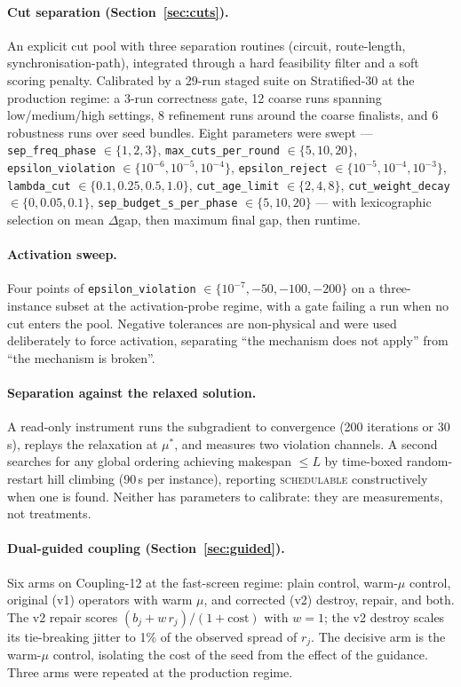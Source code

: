 \documentclass[11pt,a4paper]{article}
\begin{document}
\paragraph{Cut separation (Section~\ref{sec:cuts}).}
An explicit cut pool with three separation routines (circuit, route-length,
synchronisation-path), integrated through a hard feasibility filter and a soft
scoring penalty. Calibrated by a 29-run staged suite on Stratified-30 at the
production regime: a 3-run correctness gate, 12 coarse runs spanning
low/medium/high settings, 8 refinement runs around the coarse finalists, and 6
robustness runs over seed bundles. Eight parameters were swept ---
\texttt{sep\_freq\_phase} $\in\{1,2,3\}$,
\texttt{max\_cuts\_per\_round} $\in\{5,10,20\}$,
\texttt{epsilon\_violation} $\in\{10^{-6},10^{-5},10^{-4}\}$,
\texttt{epsilon\_reject} $\in\{10^{-5},10^{-4},10^{-3}\}$,
\texttt{lambda\_cut} $\in\{0.1,0.25,0.5,1.0\}$,
\texttt{cut\_age\_limit} $\in\{2,4,8\}$,
\texttt{cut\_weight\_decay} $\in\{0,0.05,0.1\}$,
\texttt{sep\_budget\_s\_per\_phase} $\in\{5,10,20\}$ --- with lexicographic
selection on mean $\Delta$gap, then maximum final gap, then runtime.

\paragraph{Activation sweep.}
Four points of \texttt{epsilon\_violation} $\in\{10^{-7},-50,-100,-200\}$ on a
three-instance subset at the activation-probe regime, with a gate failing a run
when no cut enters the pool. Negative tolerances are non-physical and were used
deliberately to force activation, separating ``the mechanism does not apply'' from
``the mechanism is broken''.

\paragraph{Separation against the relaxed solution.}
A read-only instrument runs the subgradient to convergence (200 iterations or
30\,s), replays the relaxation at $\mu^\ast$, and measures two violation channels.
A second searches for any global ordering achieving makespan $\le L$ by time-boxed
random-restart hill climbing (90\,s per instance), reporting \textsc{schedulable}
constructively when one is found. Neither has parameters to calibrate: they are
measurements, not treatments.

\paragraph{Dual-guided coupling (Section~\ref{sec:guided}).}
Six arms on Coupling-12 at the fast-screen regime: plain control, warm-$\mu$
control, original (v1) operators with warm $\mu$, and corrected (v2) destroy,
repair, and both. The v2 repair scores $(b_j+w\,r_j)/(1+\text{cost})$ with $w=1$;
the v2 destroy scales its tie-breaking jitter to 1\% of the observed spread of
$r_j$. The decisive arm is the warm-$\mu$ control, isolating the cost of the seed
from the effect of the guidance. Three arms were repeated at the production
regime.
\end{document}
